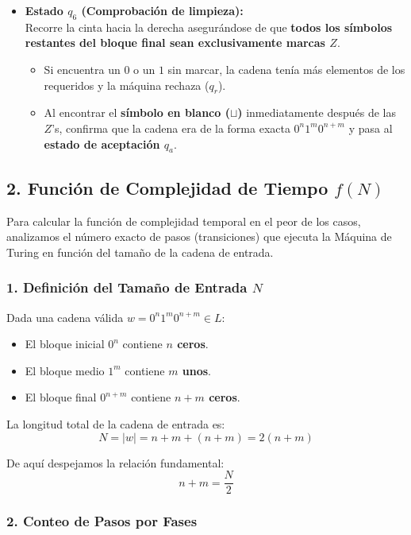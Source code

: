 \begin{itemize}[leftmargin=*]
    \item \textbf{Estado $q_6$ (Comprobación de limpieza):}\\
    Recorre la cinta hacia la derecha asegurándose de que \textbf{todos los símbolos restantes del bloque final sean exclusivamente marcas $Z$}.
    \begin{itemize}[leftmargin=*]
        \item Si encuentra un $0$ o un $1$ sin marcar, la cadena tenía más elementos de los requeridos y la máquina rechaza ($q_r$).
        \item Al encontrar el \textbf{símbolo en blanco ($\sqcup$)} inmediatamente después de las $Z$'s, confirma que la cadena era de la forma exacta $0^n 1^m 0^{n+m}$ y pasa al \textbf{estado de aceptación $q_a$}.
    \end{itemize}
\end{itemize}

\subsection*{2. Función de Complejidad de Tiempo $f(N)$}

Para calcular la función de complejidad temporal en el peor de los casos, analizamos el número exacto de pasos (transiciones) que ejecuta la Máquina de Turing en función del tamaño de la cadena de entrada.

\subsubsection*{1. Definición del Tamaño de Entrada $N$}

Dada una cadena válida $w = 0^n 1^m 0^{n+m} \in L$:
\begin{itemize}[leftmargin=*]
    \item El bloque inicial $0^n$ contiene \textbf{$n$ ceros}.
    \item El bloque medio $1^m$ contiene \textbf{$m$ unos}.
    \item El bloque final $0^{n+m}$ contiene \textbf{$n+m$ ceros}.
\end{itemize}

La longitud total de la cadena de entrada es:
\[ N = |w| = n + m + (n + m) = 2(n + m) \]

De aquí despejamos la relación fundamental:
\[ n + m = \frac{N}{2} \]

\subsubsection*{2. Conteo de Pasos por Fases}

